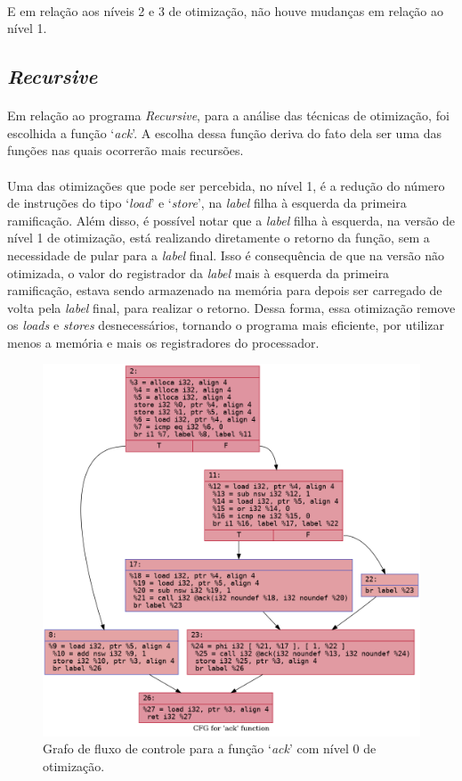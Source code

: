 \documentclass[12pt]{article}
\begin{document}
\paragraph{}E em relação aos níveis 2 e 3 de otimização, não houve mudanças em relação ao nível 1.

\FloatBarrier

\subsection{\textit{Recursive}}

\paragraph{}Em relação ao programa \textit{Recursive}, para a análise das técnicas de otimização, foi escolhida a função ‘\textit{ack}’. A escolha dessa função deriva do fato dela ser uma das funções nas quais ocorrerão mais recursões.

\paragraph{}Uma das otimizações que pode ser percebida, no nível 1, é a redução do número de instruções do tipo ‘\textit{load}’ e ‘\textit{store}’, na \textit{label} filha à esquerda da primeira ramificação. Além disso, é possível notar que a \textit{label} filha à esquerda, na versão de nível 1 de otimização, está realizando diretamente o retorno da função, sem a necessidade de pular para a \textit{label} final. Isso é consequência de que na versão não otimizada, o valor do registrador da \textit{label} mais à esquerda da primeira ramificação, estava sendo armazenado na memória para depois ser carregado de volta pela \textit{label} final, para realizar o retorno. Dessa forma, essa otimização remove os \textit{loads} e \textit{stores} desnecessários, tornando o programa mais eficiente, por utilizar menos a memória e mais os registradores do processador.

\begin{figure}
    \centering
    \includegraphics[width=0.5\linewidth]{recursive_.ack_O0.png}
    \caption{Grafo de fluxo de controle para a função ‘\textit{ack}’ com nível 0 de otimização.}
\end{figure}
\end{document}

